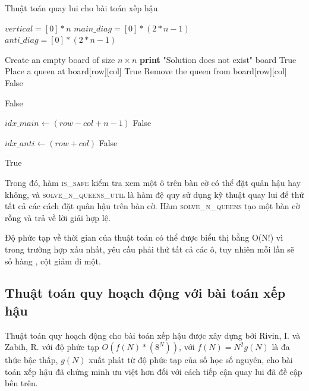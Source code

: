 \begin{algorithm}[H]

\caption{Thuật toán quay lui cho bài toán xếp hậu}
\begin{algorithmic}[1]
\State $vertical = [0] * n$
\State $main\_diag =  [0] * (2 * n - 1)$
\State $anti\_diag = [0] * (2 * n - 1)$

\State
{}
    \State Create an empty board of size $n \times n$
        \State \textbf{print} "Solution does not exist"
    \EndIf
    \State \Return board
\EndFunction
\State
{}
        \State \Return True
    \EndIf
            \State Place a queen at board[row][col]
                \State \Return True
            \EndIf
            \State Remove the queen from board[row][col]
        \EndIf
    \EndFor
    \State \Return False
\EndFunction
\State
{}
    	
            \State \Return False
        \EndIf
    
  		\State $idx\_main \gets (row - col + n - 1)$
            \State \Return False
        \EndIf

   		\State $idx\_anti \gets (row + col)$
            \State \Return False
        \EndIf
    
    \State \Return True
\EndFunction
\end{algorithmic}
\end{algorithm}

Trong đó, hàm \textsc{is\_safe} kiểm tra xem một ô trên bàn cờ có thể đặt quân hậu hay không, và \textsc{solve\_n\_queens\_util} là hàm đệ quy sử dụng kỹ thuật quay lui để thử tất cả các cách đặt quân hậu trên bàn cờ. Hàm \textsc{solve\_n\_queens} tạo một bàn cờ rỗng và trả về lời giải hợp lệ.

Độ phức tạp về thời gian của thuật toán có thể được biểu thị bằng O(N!) vì trong trường hợp xấu nhất, yêu cầu phải thử tất cả các ô, tuy nhiên mỗi lần sẽ số hàng , cột giảm đi một.

\subsection{Thuật toán quy hoạch động với bài toán xếp hậu}
Thuật toán quy hoạch động cho bài toán xếp hậu được xây dựng bởi Rivin, I. và Zabih, R.\cite{dynamic programming solution} với độ phức tạp $O( f(N)*(8^N))$, với $f(N) = N^2g(N)$ là đa thức bậc thấp, $g(N)$ xuất phát từ độ phức tạp của số học số nguyên, cho bài toán xếp hậu đã chứng minh ưu việt hơn đối với cách tiếp cận quay lui đã đề cập bên trên.

